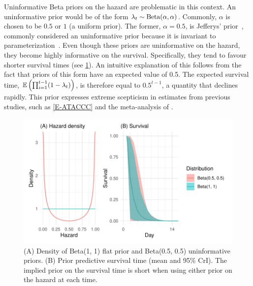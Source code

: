 \documentclass[thesis.tex]{subfiles}
\begin{document}
Uninformative Beta priors on the hazard are problematic in this context.
An uninformative prior would be of the form $\lambda_t \sim \operatorname{Beta}(\alpha, \alpha)$.
Commonly, $\alpha$ is chosen to be $0.5$ or $1$ (a uniform prior).
The former, $\alpha = 0.5$, is Jefferys’ prior~\autocite{jeffreysInvariant}, commonly considered an uninformative prior because it is invariant to parameterization~\autocite[53]{gelmanBDA}.
Even though these priors are uninformative on the hazard, they become highly informative on the survival. 
Specifically, they tend to favour shorter survival times (see \cref{perf-test:fig:flat-prior}).
An intuitive explanation of this follows from the fact that priors of this form have an expected value of 0.5.
The expected survival time, $\operatorname{\mathbb{E}} \left( \prod_{i=1}^{t-1} (1-\lambda_t) \right)$, is therefore equal to $0.5^{t-1}$, a quantity that declines rapidly.
This prior expresses extreme scepticism in estimates from previous studies, such as \cref{E-ATACCC} and the meta-analysis of \textcite{cevikShedding}.
\begin{figure}
  \centering \includegraphics{cis-perfect-testing/flat-prior}
  \caption[Uninformative priors for the hazard]{
    (A) Density of Beta(1, 1) flat prior and Beta(0.5, 0.5) uninformative priors.
    (B) Prior predictive survival time (mean and 95\% CrI).
    The implied prior on the survival time is short when using either prior on the hazard at each time.
  }
 \label{perf-test:fig:flat-prior}
\end{figure}
\end{document}
